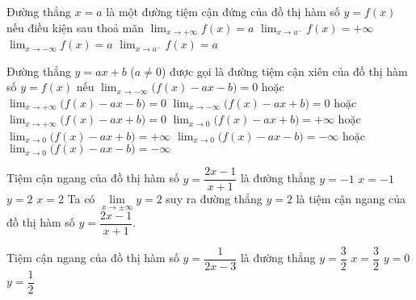 \boxde
\BTTN
\begin{ex}%
 Đường thẳng $x = a$ là một đường tiệm cận đứng của
 đồ thị hàm số $ y = f (x)$ nếu điều kiện sau thoả mãn
 \choice
 {$\displaystyle\lim_{x\to +\infty }f(x)=a$}
 {\True $\displaystyle\lim_{x\to a^-}f(x)=+\infty $}
 {$\displaystyle\lim_{x\to -\infty }f(x)=a$}
 {$\displaystyle\lim_{x\to a^-}f(x)=a $}
\end{ex}
\begin{ex}%
 Đường thẳng $y = ax + b$ ($a \neq 0$) được gọi là đường tiệm cận xiên của đồ thị hàm số $y = f(x)$ nếu
 \choice
 {\True $\displaystyle\lim_{x\to -\infty }\big(f(x)-ax-b\big)=0$ hoặc $\displaystyle\lim_{x\to +\infty }\big(f(x)-ax-b\big)=0$}
 {$\displaystyle\lim_{x\to -\infty }\big(f(x)-ax+b\big)=0$ hoặc $\displaystyle\lim_{x\to +\infty }\big(f(x)-ax+b\big)=0$}
 {$\displaystyle\lim_{x\to 0 }\big(f(x)-ax+b\big)=+\infty$ hoặc $\displaystyle\lim_{x\to 0 }\big(f(x)-ax+b\big)=+\infty$}
 {$\displaystyle\lim_{x\to 0 }\big(f(x)-ax-b\big)=-\infty$ hoặc $\displaystyle\lim_{x\to 0 }\big(f(x)-ax-b\big)=-\infty$}
\end{ex}
\begin{ex}
 Tiệm cận ngang của đồ thị hàm số $ y=\dfrac{2x-1}{x+1} $ là đường thẳng
 \choice
 {$y=-1$}
 {$ x=-1 $}
 {\True $ y=2 $}
 {$ x=2 $}
 \loigiai
 {
 Ta có $ \lim\limits_{x\to \pm\infty}y=2$ suy ra đường thẳng $ y=2 $ là tiệm cận ngang của đồ thị hàm số $ y=\dfrac{2x-1}{x+1} $.
 }
\end{ex}
\begin{ex}
 Tiệm cận ngang của đồ thị hàm số $y=\dfrac{1}{2x-3}$ là đường thẳng
 \choice
 {$y=\dfrac{3}{2}$}
 {$x=\dfrac{3}{2}$}
 {\True $y=0$}
 {$y=\dfrac{1}{2}$}
\end{ex}
